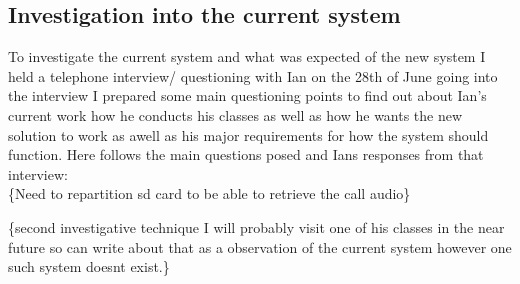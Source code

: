 \documentclass[a4paper]{article}
\begin{document}
 	\subsection{Investigation into the current system}
	To investigate the current system and what was expected of the new system I held a telephone interview/ questioning with Ian on the 28th of June going into the interview I prepared some main questioning points to find out about Ian's current work how he conducts his classes as well as how he wants the new solution to work as awell as his major requirements for how the system should function. Here follows the main questions posed and Ians responses from that interview: \\
	\{Need to repartition sd card to be able to retrieve the call audio\}

	\{second investigative technique I will probably visit one of his classes in the near future so can write about that as a observation of the current system however one such system doesnt exist.\}
\end{document}
